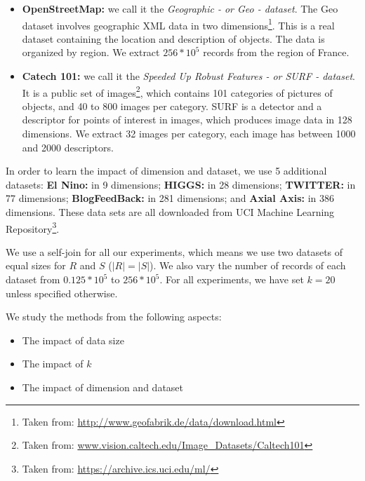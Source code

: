 \documentclass[10pt,journal,compsoc]{IEEEtran}
\begin{document}
\begin{itemize}

\item \textbf{OpenStreetMap: }we call it the \emph{Geographic - or Geo - dataset}. The Geo dataset  
involves geographic XML data in two dimensions\footnote{Taken from: \url{http://www.geofabrik.de/data/download.html}}. 
This is a real dataset containing the location and description of objects. The data is organized by region. We extract 
$256*10^5$ records from the region of France.

\item \textbf{Catech 101: }we call it the \emph{Speeded Up Robust Features - or SURF - dataset}. It is a public set of images\footnote{Taken from: \url{www.vision.caltech.edu/Image_Datasets/Caltech101}}, which contains 101 categories of pictures of objects, and 40 to 800 images per category. 
SURF\cite{Surf} is a detector and a descriptor for points of interest in images, which produces image data
in 128 dimensions.  We extract 32 images per category, each image has between 1000 and 2000 descriptors.

\end{itemize}

In order to learn the impact of dimension and dataset, we use 5 additional datasets: \textbf{El Nino: } in 9 dimensions; \textbf{HIGGS: } in 28 dimensions; \textbf{TWITTER: } in 77 dimensions; \textbf{BlogFeedBack: } in 281 dimensions; and \textbf{Axial Axis: } in 386 dimensions. These data sets are all downloaded from UCI Machine Learning Repository\footnote{Taken from: \url{https://archive.ics.uci.edu/ml/}}.



We use a self-join for all our experiments, which means we use two datasets of equal sizes for $R$ and $S$ 
($|R|=|S|$). We also vary the number of 
records of each dataset from $0.125*10^5$ to $256*10^5$.
For all experiments, we have set $k=20$ unless specified otherwise. 

We study the methods from the following aspects:
\begin{itemize}

\item The impact of data size

\item The impact of $k$

\item The impact of dimension and dataset

\end{itemize}
\end{document}
